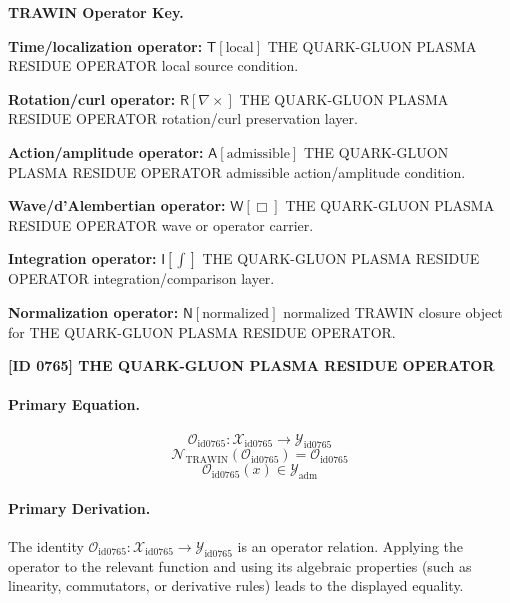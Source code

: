 \par\vspace{0.45\baselineskip}
\noindent\begin{minipage}[t]{\linewidth}
\begingroup
\small
\raggedright
\textbf{TRAWIN Operator Key.}\par
\noindent\textbf{Time/localization operator:} $\mathsf{T}\!\left[\mathrm{local}\right]$ THE QUARK-GLUON PLASMA RESIDUE OPERATOR local source condition.\par
\noindent\textbf{Rotation/curl operator:} $\mathsf{R}\!\left[\nabla\times\right]$ THE QUARK-GLUON PLASMA RESIDUE OPERATOR rotation/curl preservation layer.\par
\noindent\textbf{Action/amplitude operator:} $\mathsf{A}\!\left[\mathrm{admissible}\right]$ THE QUARK-GLUON PLASMA RESIDUE OPERATOR admissible action/amplitude condition.\par
\noindent\textbf{Wave/d'Alembertian operator:} $\mathsf{W}\!\left[\Box\right]$ THE QUARK-GLUON PLASMA RESIDUE OPERATOR wave or operator carrier.\par
\noindent\textbf{Integration operator:} $\mathsf{I}\!\left[\int\right]$ THE QUARK-GLUON PLASMA RESIDUE OPERATOR integration/comparison layer.\par
\noindent\textbf{Normalization operator:} $\mathsf{N}\!\left[\mathrm{normalized}\right]$ normalized TRAWIN closure object for THE QUARK-GLUON PLASMA RESIDUE OPERATOR.\par
\endgroup
\end{minipage}

\clearpage
\noindent\textbf{[ID 0765] THE QUARK-GLUON PLASMA RESIDUE OPERATOR}\par
\vspace{0.35em}
\paragraph{Primary Equation.}
\[
\mathcal{O}_{\mathrm{id0765}}:\mathcal{X}_{\mathrm{id0765}}\longrightarrow\mathcal{Y}_{\mathrm{id0765}}
\]
\[
\mathcal{N}_{\mathrm{TRAWIN}}(\mathcal{O}_{\mathrm{id0765}})=\mathcal{O}_{\mathrm{id0765}}
\]
\[
\mathcal{O}_{\mathrm{id0765}}(x)\in\mathcal{Y}_{\mathrm{adm}}
\]

\paragraph{Primary Derivation.}
The identity \( \mathcal{O}_{\mathrm{id0765}}:\mathcal{X}_{\mathrm{id0765}}\longrightarrow\mathcal{Y}_{\mathrm{id0765}} \) is an operator relation. Applying the operator to the relevant function and using its algebraic properties (such as linearity, commutators, or derivative rules) leads to the displayed equality.
